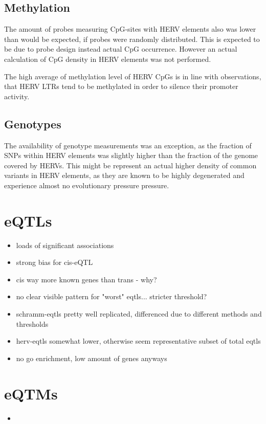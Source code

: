\documentclass[a4paper,12pt,twoside,openright]{report}
\begin{document}
\subsection{Methylation}
\label{Discussion:Methylation}
The amount of probes measuring CpG-sites with HERV elements also was lower than would be expected, if probes were randomly distributed. This is expected to be due to probe design instead actual CpG occurrence. However an actual calculation of CpG density in HERV elements was not performed. 

The high average of methylation level of HERV CpGs is in line with observations, that HERV LTRs tend to be methylated in order to silence their promoter activity\cite{Smith2013}.

\subsection{Genotypes}
\label{Discussion:Genotypes}
The availability of genotype measurements was an exception, as the fraction of SNPs within HERV elements was slightly higher than the fraction of the genome covered by HERVs. This might be represent an actual higher density of common variants in HERV elements, as they are known to be highly degenerated and experience almost no evolutionary pressure pressure\cite{10.1146/annurev.genom.7.080505.115700}.

\section{eQTLs}
\label{Discussion:eQTLs}
\begin{itemize}
\item loads of significant associations
\item strong bias for cis-eQTL \cite{}
\item cis way more known genes than trans - why?
\item no clear visible pattern for "worst" eqtls... stricter threshold?
\item schramm-eqtls pretty well replicated, differenced due to different methods and thresholds
\item herv-eqtls somewhat lower, otherwise seem representative subset of total eqtls
\item no go enrichment, low amount of genes anyways
\end{itemize}
\section{eQTMs}
\label{Discussion:eQTMs}
\begin{itemize}
\item 
\end{itemize}
\end{document}
